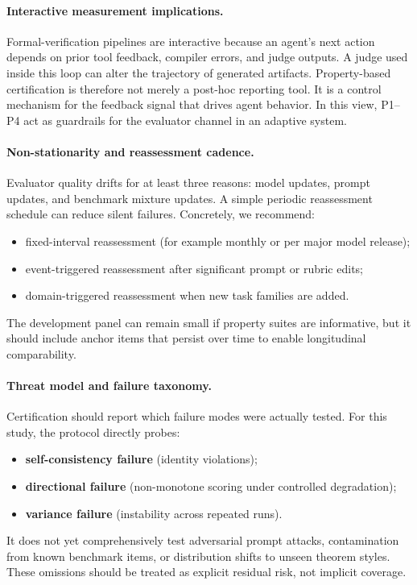 \paragraph{Interactive measurement implications.}
Formal-verification pipelines are interactive because an agent's next action depends on prior tool feedback, compiler errors, and judge outputs.
A judge used inside this loop can alter the trajectory of generated artifacts.
Property-based certification is therefore not merely a post-hoc reporting tool.
It is a control mechanism for the feedback signal that drives agent behavior.
In this view, P1--P4 act as guardrails for the evaluator channel in an adaptive system.

\paragraph{Non-stationarity and reassessment cadence.}
Evaluator quality drifts for at least three reasons:
model updates, prompt updates, and benchmark mixture updates.
A simple periodic reassessment schedule can reduce silent failures.
Concretely, we recommend:
\begin{itemize}
\item fixed-interval reassessment (for example monthly or per major model release);
\item event-triggered reassessment after significant prompt or rubric edits;
\item domain-triggered reassessment when new task families are added.
\end{itemize}
The development panel can remain small if property suites are informative, but it should include anchor items that persist over time to enable longitudinal comparability.

\paragraph{Threat model and failure taxonomy.}
Certification should report which failure modes were actually tested.
For this study, the protocol directly probes:
\begin{itemize}
\item \textbf{self-consistency failure} (identity violations);
\item \textbf{directional failure} (non-monotone scoring under controlled degradation);
\item \textbf{variance failure} (instability across repeated runs).
\end{itemize}
It does not yet comprehensively test adversarial prompt attacks, contamination from known benchmark items, or distribution shifts to unseen theorem styles.
These omissions should be treated as explicit residual risk, not implicit coverage.

